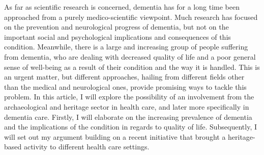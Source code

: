 	As far as scientific research is concerned, dementia has for a long time been approached from a purely medico-scientific viewpoint. Much research has focused on the prevention and neurological progress of dementia, but not on the important social and psychological implications and consequences of this condition. Meanwhile, there is a large and increasing group of people suffering from dementia, who are dealing with decreased quality of life and a poor general sense of well-being as a result of their condition and the way it is handled. This is an urgent matter, but different approaches, hailing from different fields other than the medical and neurological ones, provide promising ways to tackle this problem.
	In this article, I will explore the possibility of an involvement from the archaeological and heritage sector in health care, and later more specifically in dementia care. Firstly, I will elaborate on the increasing prevalence of dementia and the implications of the condition in regards to quality of life. Subsequently, I will set out my argument building on a recent initiative that brought a heritage-based activity to different health care settings.
		
	
